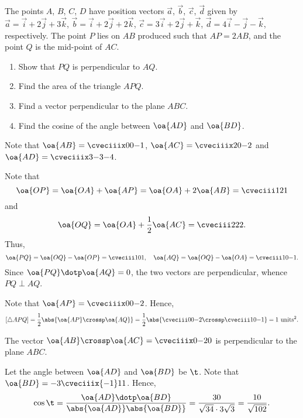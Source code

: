 \begin{problem}
    The points $A$, $B$, $C$, $D$ have position vectors $\vec a$, $\vec b$, $\vec c$, $\vec d$ given by $\vec a = \vec i + 2\vec j + 3\vec k$, $\vec b = \vec i + 2\vec j + 2\vec k$, $\vec c = 3\vec i + 2 \vec j + \vec k$, $\vec d = 4\vec i - \vec j - \vec k$, respectively. The point $P$ lies on $AB$ produced such that $AP = 2AB$, and the point $Q$ is the mid-point of $AC$.

    \begin{enumerate}
        \item Show that $PQ$ is perpendicular to $AQ$.
        \item Find the area of the triangle $APQ$.
        \item Find a vector perpendicular to the plane $ABC$.
        \item Find the cosine of the angle between $\oa{AD}$ and $\oa{BD}$.
    \end{enumerate}
\end{problem}
\begin{solution}
    Note that $\oa{AB} = \cveciiix00{-1}$, $\oa{AC} = \cveciiix20{-2}$ and $\oa{AD} = \cveciiix3{-3}{-4}$.
    \begin{ppart}
        Note that \[\oa{OP} = \oa{OA} + \oa{AP} = \oa{OA} + 2\oa{AB} = \cveciii121\] and \[\oa{OQ} = \oa{OA} + \frac12 \oa{AC} = \cveciii222.\] Thus, \[\oa{PQ} = \oa{OQ} - \oa{OP} = \cveciii101, \quad \oa{AQ} = \oa{OQ} - \oa{OA} = \cveciii10{-1}.\] Since $\oa{PQ} \dotp \oa{AQ} = 0$, the two vectors are perpendicular, whence $PQ \perp AQ$.
    \end{ppart}
    \begin{ppart}
        Note that $\oa{AP} = \cveciiix00{-2}$. Hence, \[[\triangle APQ] = \frac12 \abs{\oa{AP} \crossp \oa{AQ}} = \frac12 \abs{\cveciii00{-2} \crossp \cveciii10{-1}} = 1 \text{ units$^2$}.\]
    \end{ppart}
    \begin{ppart}
        The vector $\oa{AB} \crossp \oa{AC} = \cveciiix0{-2}0$ is perpendicular to the plane $ABC$.
    \end{ppart}
    \begin{ppart}
        Let the angle between $\oa{AD}$ and $\oa{BD}$ be $\t$. Note that $\oa{BD} = -3\cveciiix{-1}11$. Hence, \[\cos\t = \frac{\oa{AD} \dotp \oa{BD}}{\abs{\oa{AD}} \abs{\oa{BD}}} = \frac{30}{\sqrt{34}\cdot3\sqrt{3}} = \frac{10}{\sqrt{102}}.\]
    \end{ppart}
\end{solution}